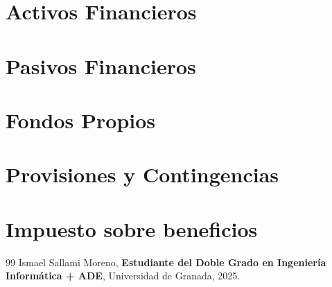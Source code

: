 \documentclass[a4paper,12pt]{book}
\begin{document}

\tableofcontents
\newpage

\chapter{Activos Financieros}



\chapter{Pasivos Financieros}



\chapter{Fondos Propios}


\chapter{Provisiones y Contingencias}


\chapter{Impuesto sobre beneficios}


%


\newpage
\begin{thebibliography}{99}
Ismael Sallami Moreno, \textbf{Estudiante del Doble Grado en Ingeniería Informática + ADE}, Universidad de Granada, 2025.

\end{thebibliography}
\end{document}
